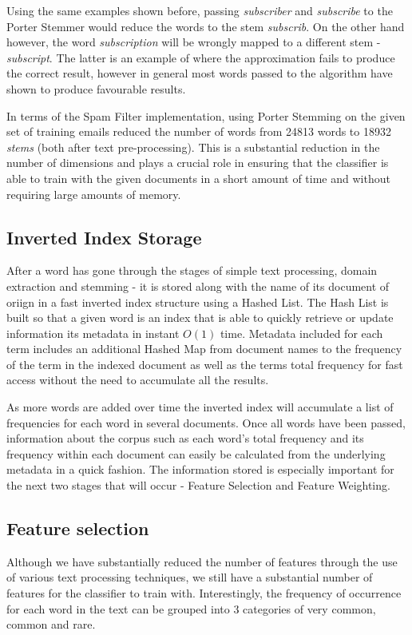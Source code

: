 Using the same examples shown before, passing \emph{subscriber} and \emph{subscribe} to the Porter Stemmer would reduce the words to the stem \emph{subscrib}. On the other hand however, the word \emph{subscription} will be wrongly mapped to a different stem - \emph{subscript}. The latter is an example of where the approximation fails to produce the correct result, however in general most words passed to the algorithm have shown to produce favourable results.

In terms of the Spam Filter implementation, using Porter Stemming on the given set of training emails reduced the number of words from 24813 words to 18932 \textit{stems} (both after text pre-processing). This is a substantial reduction in the number of dimensions and plays a crucial role in ensuring that the classifier is able to train with the given documents in a short amount of time and without requiring large amounts of memory.

\subsection{Inverted Index Storage}

After a word has gone through the stages of simple text processing, domain extraction and stemming - it is stored along with the name of its document of oriign in a fast inverted index structure using a Hashed List. The Hash List is built so that a given word is an index that is able to quickly retrieve or update information its metadata in instant $O(1)$ time. Metadata included for each term includes an additional Hashed Map from document names to the frequency of the term in the indexed document as well as the terms total frequency for fast access without the need to accumulate all the results.

As more words are added over time the inverted index will accumulate a list of frequencies for each word in several documents. Once all words have been passed, information about the corpus such as each word's total frequency and its frequency within each document can easily be calculated from the underlying metadata in a quick fashion. The information stored is especially important for the next two stages that will occur - Feature Selection and Feature Weighting.

\subsection{Feature selection}
Although we have substantially reduced the number of features through the use of various text processing techniques, we still have a substantial number of features for the classifier to train with. Interestingly, the frequency of occurrence for each word in the text can be grouped into 3 categories of very common, common and rare. 

